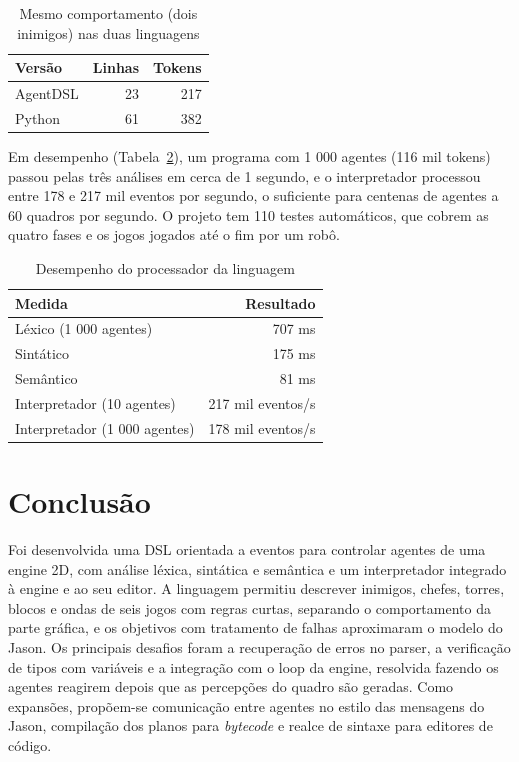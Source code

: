 \documentclass[conference]{IEEEtran}
\begin{document}
\begin{table}[htbp]
\caption{Mesmo comportamento (dois inimigos) nas duas linguagens}
\begin{center}
\begin{tabular}{lrr}
\toprule
Versão & Linhas & Tokens \\
\midrule
AgentDSL & 23 & 217 \\
Python & 61 & 382 \\
\bottomrule
\end{tabular}
\label{tab:concisao}
\end{center}
\end{table}
Em desempenho (Tabela~\ref{tab:desempenho}), um programa com 1 000 agentes (116 mil tokens) passou pelas três análises em cerca de 1 segundo, e o interpretador processou entre 178 e 217 mil eventos por segundo, o suficiente para centenas de agentes a 60 quadros por segundo. O projeto tem 110 testes automáticos, que cobrem as quatro fases e os jogos jogados até o fim por um robô.
\begin{table}[htbp]
\caption{Desempenho do processador da linguagem}
\begin{center}
\begin{tabular}{lr}
\toprule
Medida & Resultado \\
\midrule
Léxico (1 000 agentes) & 707 ms \\
Sintático & 175 ms \\
Semântico & 81 ms \\
Interpretador (10 agentes) & 217 mil eventos/s \\
Interpretador (1 000 agentes) & 178 mil eventos/s \\
\bottomrule
\end{tabular}
\label{tab:desempenho}
\end{center}
\end{table}

\section{Conclusão}
Foi desenvolvida uma DSL orientada a eventos para controlar agentes de uma engine 2D, com análise léxica, sintática e semântica e um interpretador integrado à engine e ao seu editor. A linguagem permitiu descrever inimigos, chefes, torres, blocos e ondas de seis jogos com regras curtas, separando o comportamento da parte gráfica, e os objetivos com tratamento de falhas aproximaram o modelo do Jason.
Os principais desafios foram a recuperação de erros no parser, a verificação de tipos com variáveis e a integração com o loop da engine, resolvida fazendo os agentes reagirem depois que as percepções do quadro são geradas. Como expansões, propõem-se comunicação entre agentes no estilo das mensagens do Jason, compilação dos planos para \textit{bytecode} e realce de sintaxe para editores de código.
\end{document}
